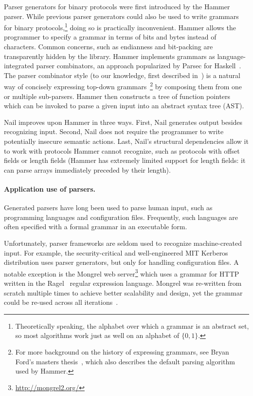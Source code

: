 Parser generators for binary protocols were first introduced by the
Hammer~\cite{hammer-parser} parser.
While previous parser generators could also be used to write grammars
for binary protocols,\footnote{Theoretically speaking, the alphabet
over which a grammar is an  abstract set, so most algorithms work
just as well on an alphabet of $\{0,1\}$.} doing so is practically
inconvenient. Hammer allows the programmer to specify a grammar in
terms of bits and bytes instead of characters. Common concerns, such as
endianness and bit-packing are transparently hidden by the library. Hammer
implements grammars as language-integrated parser combinators, an approach
popularized by Parsec for Haskell~\cite{LeijenMeijer:parsec}. The
parser combinator style (to our knowledge, first  described
in~\cite{burge1975recursive}) is a natural way of concisely expressing
top-down grammars~\cite{Danielsson:2010:TPC:1863543.1863585}\footnote{For
more background on the history of expressing grammars, see Bryan Ford's
masters thesis~\cite{ford2002packrat}, which also describes the default
parsing algorithm used by Hammer.} by composing them from one or multiple
sub-parsers.  Hammer then constructs a tree of function pointers which
can be invoked to parse a given input into an abstract syntax tree (AST).

Nail improves upon Hammer in three ways. First, Nail  generates output besides recognizing input.
Second, Nail does not require the programmer to write potentially insecure semantic actions. Last,
Nail's structural dependencies allow it to work with protocols Hammer cannot recognize, such as
protocols with offset fields or length fields (Hammer has extremely limited support for length
fields: it can parse arrays immediately preceded by their length).

\paragraph{Application use of parsers.}
Generated parsers have long been used to parse human input, such as programming languages and
configuration files. Frequently, such languages are often specified with a formal grammar in an
executable form.

Unfortunately,  parser frameworks are seldom used  to recognize
machine-created input. For example, the security-critical and
well-engineered MIT Kerberos distribution uses parser generators, but
only for handling configuration files. A notable exception is the Mongrel
web server\footnote{\url{http://mongrel2.org/}} which uses a grammar
for HTTP written in the Ragel~\cite{ragel-paper} regular expression
language. Mongrel was re-written from scratch multiple times to achieve
better scalability and design, yet the grammar could be  re-used across
all iterations~\cite{patterson-citation}.







